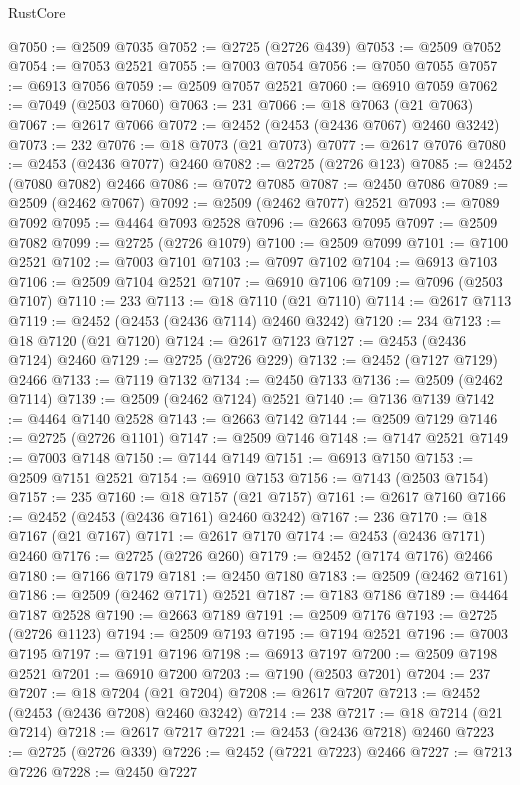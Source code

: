 \begin{lexlean}{RustCore}
\begin{coremodule}
@7050 := @2509 @7035
@7052 := @2725 (@2726 @439)
@7053 := @2509 @7052
@7054 := @7053 @2521
@7055 := @7003 @7054
@7056 := @7050 @7055
@7057 := @6913 @7056
@7059 := @2509 @7057 @2521
@7060 := @6910 @7059
@7062 := @7049 (@2503 @7060)
@7063 := 231
@7066 := @18 @7063 (@21 @7063)
@7067 := @2617 @7066
@7072 := @2452 (@2453 (@2436 @7067) @2460 @3242)
@7073 := 232
@7076 := @18 @7073 (@21 @7073)
@7077 := @2617 @7076
@7080 := @2453 (@2436 @7077) @2460
@7082 := @2725 (@2726 @123)
@7085 := @2452 (@7080 @7082) @2466
@7086 := @7072 @7085
@7087 := @2450 @7086
@7089 := @2509 (@2462 @7067)
@7092 := @2509 (@2462 @7077) @2521
@7093 := @7089 @7092
@7095 := @4464 @7093 @2528
@7096 := @2663 @7095
@7097 := @2509 @7082
@7099 := @2725 (@2726 @1079)
@7100 := @2509 @7099
@7101 := @7100 @2521
@7102 := @7003 @7101
@7103 := @7097 @7102
@7104 := @6913 @7103
@7106 := @2509 @7104 @2521
@7107 := @6910 @7106
@7109 := @7096 (@2503 @7107)
@7110 := 233
@7113 := @18 @7110 (@21 @7110)
@7114 := @2617 @7113
@7119 := @2452 (@2453 (@2436 @7114) @2460 @3242)
@7120 := 234
@7123 := @18 @7120 (@21 @7120)
@7124 := @2617 @7123
@7127 := @2453 (@2436 @7124) @2460
@7129 := @2725 (@2726 @229)
@7132 := @2452 (@7127 @7129) @2466
@7133 := @7119 @7132
@7134 := @2450 @7133
@7136 := @2509 (@2462 @7114)
@7139 := @2509 (@2462 @7124) @2521
@7140 := @7136 @7139
@7142 := @4464 @7140 @2528
@7143 := @2663 @7142
@7144 := @2509 @7129
@7146 := @2725 (@2726 @1101)
@7147 := @2509 @7146
@7148 := @7147 @2521
@7149 := @7003 @7148
@7150 := @7144 @7149
@7151 := @6913 @7150
@7153 := @2509 @7151 @2521
@7154 := @6910 @7153
@7156 := @7143 (@2503 @7154)
@7157 := 235
@7160 := @18 @7157 (@21 @7157)
@7161 := @2617 @7160
@7166 := @2452 (@2453 (@2436 @7161) @2460 @3242)
@7167 := 236
@7170 := @18 @7167 (@21 @7167)
@7171 := @2617 @7170
@7174 := @2453 (@2436 @7171) @2460
@7176 := @2725 (@2726 @260)
@7179 := @2452 (@7174 @7176) @2466
@7180 := @7166 @7179
@7181 := @2450 @7180
@7183 := @2509 (@2462 @7161)
@7186 := @2509 (@2462 @7171) @2521
@7187 := @7183 @7186
@7189 := @4464 @7187 @2528
@7190 := @2663 @7189
@7191 := @2509 @7176
@7193 := @2725 (@2726 @1123)
@7194 := @2509 @7193
@7195 := @7194 @2521
@7196 := @7003 @7195
@7197 := @7191 @7196
@7198 := @6913 @7197
@7200 := @2509 @7198 @2521
@7201 := @6910 @7200
@7203 := @7190 (@2503 @7201)
@7204 := 237
@7207 := @18 @7204 (@21 @7204)
@7208 := @2617 @7207
@7213 := @2452 (@2453 (@2436 @7208) @2460 @3242)
@7214 := 238
@7217 := @18 @7214 (@21 @7214)
@7218 := @2617 @7217
@7221 := @2453 (@2436 @7218) @2460
@7223 := @2725 (@2726 @339)
@7226 := @2452 (@7221 @7223) @2466
@7227 := @7213 @7226
@7228 := @2450 @7227

\end{coremodule}
\end{lexlean}
